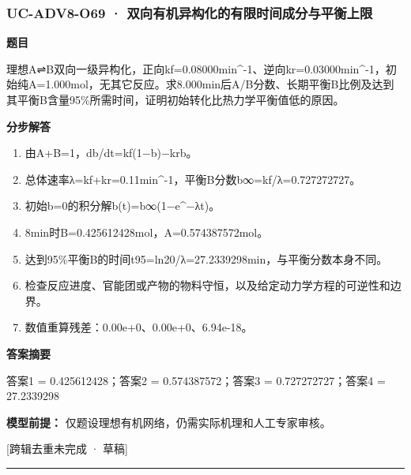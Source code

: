 \documentclass[UTF8,11pt,a4paper]{ctexart}
\begin{document}
\subsubsection*{UC-ADV8-O69 · 双向有机异构化的有限时间成分与平衡上限}
\noindent\textbf{题目}\par
理想A⇌B双向一级异构化，正向kf=0.08000min\textasciicircum{}-1、逆向kr=0.03000min\textasciicircum{}-1，初始纯A=1.000mol，无其它反应。求8.000min后A/B分数、长期平衡B比例及达到其平衡B含量95\%所需时间，证明初始转化比热力学平衡值低的原因。\par
\medskip\noindent\textbf{分步解答}
\begin{enumerate}
\item 由A+B=1，db/dt=kf(1−b)−krb。
\item 总体速率λ=kf+kr=0.11min\textasciicircum{}-1，平衡B分数b∞=kf/λ=0.727272727。
\item 初始b=0的积分解b(t)=b∞(1−e\textasciicircum{}−λt)。
\item 8min时B=0.425612428mol，A=0.574387572mol。
\item 达到95\%平衡B的时间t95=ln20/λ=27.2339298min，与平衡分数本身不同。
\item 检查反应进度、官能团或产物的物料守恒，以及给定动力学方程的可逆性和边界。
\item 数值重算残差：0.00e+0、0.00e+0、6.94e-18。
\end{enumerate}
\noindent\textbf{答案摘要}\par
答案1 = 0.425612428；答案2 = 0.574387572；答案3 = 0.727272727；答案4 = 27.2339298\par
\noindent\textbf{模型前提：}
仅题设理想有机网络，仍需实际机理和人工专家审核。\par
\noindent\textcolor{red!65!black}{[跨辑去重未完成 · 草稿]} \par
\medskip\hrule\medskip
{}
\end{document}
